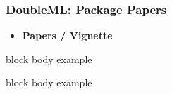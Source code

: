 \begin{frame}
\frametitle{DoubleML: Package Papers}
\begin{itemize}
\item \textbf{Papers / Vignette}
\end{itemize}
\begin{beamercolorbox}[wd=\textwidth,rounded=true,shadow=true]{block body example}
\end{beamercolorbox}
\begin{beamercolorbox}[wd=\textwidth,rounded=true,shadow=true]{block body example}
\end{beamercolorbox}
\vspace*{10pt}
\end{frame}
